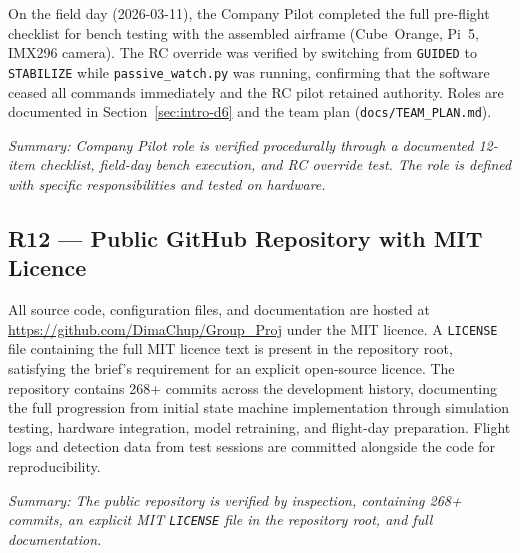 \noindent On the field day (2026-03-11), the Company Pilot completed the full pre-flight checklist for bench testing with the assembled airframe (Cube~Orange, Pi~5, IMX296 camera). The RC override was verified by switching from \texttt{GUIDED} to \texttt{STABILIZE} while \texttt{passive\_watch.py} was running, confirming that the software ceased all commands immediately and the RC pilot retained authority. Roles are documented in Section~\ref{sec:intro-d6} and the team plan (\texttt{docs/TEAM\_PLAN.md}).

\noindent\textit{Summary: Company Pilot role is verified procedurally through a documented 12-item checklist, field-day bench execution, and RC override test. The role is defined with specific responsibilities and tested on hardware.}

\subsection{R12 --- Public GitHub Repository with MIT Licence}

All source code, configuration files, and documentation are hosted at \url{https://github.com/DimaChup/Group_Proj} under the MIT licence. A \texttt{LICENSE} file containing the full MIT licence text is present in the repository root, satisfying the brief's requirement for an explicit open-source licence. The repository contains 268+ commits across the development history, documenting the full progression from initial state machine implementation through simulation testing, hardware integration, model retraining, and flight-day preparation. Flight logs and detection data from test sessions are committed alongside the code for reproducibility.

\noindent\textit{Summary: The public repository is verified by inspection, containing 268+ commits, an explicit MIT \texttt{LICENSE} file in the repository root, and full documentation.}
